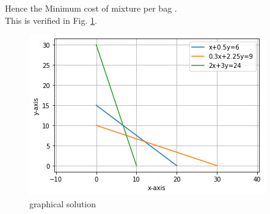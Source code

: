 \documentclass[journal,12pt,twocolumn]{IEEEtran}
\begin{document}
Hence the Minimum cost of mixture per bag  . \\ This
is verified in Fig. \ref{opt/16/fig: graphical solution}.	
%
\begin{figure}[!ht]
\centering
\includegraphics[width=\columnwidth]{download (1).png}
\caption{graphical solution}
\label{opt/16/fig: graphical solution}	
\end{figure}
\end{document}
